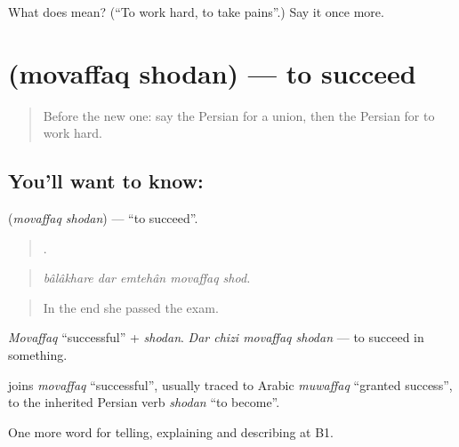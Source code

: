 \begin{tcolorbox}[breakable,colback=teal!4,colframe=teal!35!black,title={Before you move on}]
What does   mean? (\textquotedblleft{}To work hard, to take pains\textquotedblright{}.) Say it once more.
\end{tcolorbox}
\section[\texorpdfstring{\fa{موفق} \fa{شدن} (movaffaq shodan)}{موفق شدن (movaffaq shodan)}]{  (movaffaq shodan) — to succeed}

\label{lesson:FA-C384-movaffaq-shodan}



\begin{quote}
Before the new one: say the Persian for a union, then the Persian for to work hard.
\end{quote}

\subsection*{You'll want to know:  }
\textbf{ } (\emph{movaffaq shodan}) — \textquotedblleft{}to succeed\textquotedblright{}.

\begin{quote}
    .
\end{quote}

\begin{quote}
\emph{bâlâkhare dar emtehân movaffaq shod.}
\end{quote}

\begin{quote}
In the end she passed the exam.
\end{quote}

\emph{Movaffaq} \textquotedblleft{}successful\textquotedblright{} + \emph{shodan}. \emph{Dar chizi movaffaq shodan} — to succeed in something.

\begin{cousinweb}
\textbf{ } joins \emph{movaffaq} \textquotedblleft{}successful\textquotedblright{}, usually traced to Arabic \emph{muwaffaq} \textquotedblleft{}granted success\textquotedblright{}, to the inherited Persian verb \emph{shodan} \textquotedblleft{}to become\textquotedblright{}.
\end{cousinweb}

\begin{grammarlens}[title={What you've built}]
One more word for telling, explaining and describing at B1.
\end{grammarlens}


